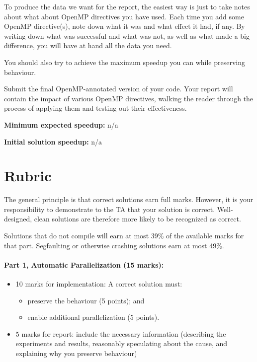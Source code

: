 \documentclass[letterpaper,10pt]{article}
\begin{document}
To produce the data we want for the report, the easiest way is just to take notes about what about OpenMP directives you have used. Each time you add some OpenMP directive(s), note down what it was and what effect it had, if any. By writing down what was successful and what was not, as well as what made a big difference, you will have at hand all the data you need.

You should also try to achieve the maximum speedup you can while preserving behaviour. 

Submit the final OpenMP-annotated version of your code. Your report will contain the impact of various OpenMP directives, walking the reader through the process of applying them and testing out their effectiveness.

\squishlist
  \item {\bf Minimum expected speedup:} n/a
  \item {\bf Initial solution speedup:} n/a
\squishend


\section*{Rubric}

The general principle is that correct solutions earn full marks.
However, it is your responsibility to demonstrate to the TA
that your solution is correct. Well-designed, clean solutions 
are therefore more likely to be recognized as correct. 

Solutions that do not compile will earn at most 39\% of the available
marks for that part. Segfaulting or otherwise crashing solutions earn
at most 49\%.

\paragraph{Part 1, Automatic Parallelization (15 marks):}  
\begin{itemize}
\item 10 marks for implementation: A correct solution must:
\begin{itemize}
	\item preserve the behaviour (5 points); and
	\item enable additional parallelization (5 points).
\end{itemize}
 
\item 5 marks for report: include the necessary information
(describing the experiments and results, reasonably speculating about
the cause, and explaining why you preserve behaviour)
\end{itemize}
\end{document}
